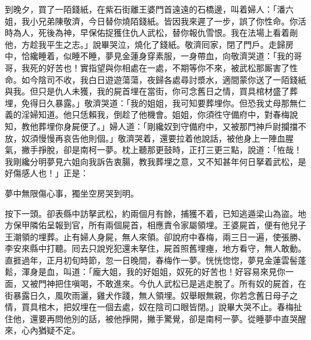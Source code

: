 到晚夕，買了一陌錢紙，在紫石街離王婆門首遠遠的石橋邊，叫着婦人：「潘六姐，我小兄弟陳敬濟，今日替你燒陌錢紙。皆因我來遲了一步，誤了你性命。你活時為人，死後為神，早保佑捉獲住仇人武松，替你報仇雪恨。我在法場上看着剮他，方趁我平生之志。」說畢哭泣，燒化了錢紙。敬濟囘家，閉了門戶。走歸房中，恰纔睡着，似睡不睡，夢見金蓮身穿素服，一身帶血，向敬濟哭道：「我的哥哥，我死的好苦也！實指望與你相處在一處，不期等你不來，被武松那厮害了性命。如今陰司不收，我白日遊遊蕩蕩，夜歸各處尋討漿水，適間蒙你送了一陌錢紙與我。但只是仇人未獲，我的屍首埋在當街，你可念舊日之情，買具棺材盛了葬埋，免得日久暴露。」敬濟哭道：「我的姐姐，我可知要葬埋你。但恐我丈母那無仁義的淫婦知道。他只恁賴我，倒趁了他機會。姐姐，你須徃守備府中，對春梅說知，教他葬埋你身屍便了。」婦人道：「剛纔奴到守備府中，又被那門神戶尉攔擋不放，奴須慢慢再哀告他則個。」敬濟哭着，還要拉着他說話，被他身上一陣血腥氣，撇手掙脫，卻是南柯一夢。枕上聽那更鼓時，正打三更三點，說道：「恠哉！我剛纔分明夢見六姐向我訴告衷腸，教我葬埋之意，又不知甚年何日拏着武松，是好傷感人也！」正是：

\begin{myquote}
夢中無限傷心事，獨坐空房哭到明。
\end{myquote}

按下一頭。卻表縣中訪拏武松，約兩個月有餘，捕獲不着，已知逃遁梁山為盜。地方保甲隣佑呈報到官，所有兩個屍首，相應責令家屬領埋。王婆屍首，便有他兒子王潮領的埋葬。止有婦人身屍，無人來領。卻說府中春梅，兩三日一遍，使張勝、李安來縣中打聽。囘去只說兇犯還未拏住，屍首照舊埋瘞，地方看守，無人敢動。直捱過年，正月初旬時節，忽一日晚間，春梅作一夢。恍恍惚惚，夢見金蓮雲髻蓬鬆，渾身是血，叫道：「龐大姐，我的好姐姐，奴死的好苦也！好容易來見你一面，又被門神把住嗔喝，不敢進來。今仇人武松已是逃走脫了。所有奴的屍首，在街暴露日久，風吹雨灑，雞犬作踐，無人領埋。奴舉眼無親，你若念舊日母子之情，買具棺木，把奴埋在一個去處，奴在陰司口眼皆閉。」{}說畢大哭不止。春梅扯住他，還要再問他別的話，被他掙開，撇手驚覺，卻是南柯一夢。從睡夢中直哭醒來，心內猶疑不定。

